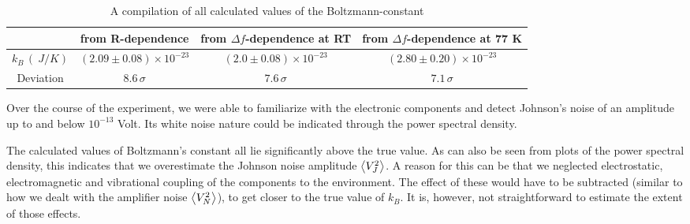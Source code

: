 \begin{table}[H]
	\renewcommand{\arraystretch}{1.5}
	\centering
	\Large
	\begin{adjustbox}{width=1\textwidth}
		\begin{tabular}{c|ccc}
			& from R-dependence & from $\Delta f$-dependence at RT & from $\Delta f$-dependence at 77 K 
			\\
			\hline
			$k_B \, (\SI{}{J/K})$ & $(2.09 \pm 0.08) \times 10^{-23}$ & $(2.0 \pm 0.08) \times 10^{-23}$  & $(2.80 \pm 0.20) \times 10^{-23}$
			\\
			Deviation & $8.6 \, \sigma$ & $7.6 \, \sigma$ & $7.1 \, \sigma$
			\\
		\end{tabular}
	\end{adjustbox}
	\caption{A compilation of all calculated values of the Boltzmann-constant }
	\label{tab:kB}
\end{table}

Over the course of the experiment, we were able to familiarize with the electronic components and detect Johnson's noise of an amplitude up to and below $10^{-13}$ Volt. Its white noise nature could be indicated through the power spectral density.

The calculated values of Boltzmann's constant all lie significantly above the true value. As can also be seen from plots of the power spectral density, this indicates that we overestimate the Johnson noise amplitude $\expval{V_J^2}$. A reason for this can be that we neglected electrostatic, electromagnetic and vibrational coupling of the components to the environment. The effect of these would have to be subtracted (similar to how we dealt with the amplifier noise $\expval{V_N^2}$), to get closer to the true value of $k_B$. It is, however, not straightforward to estimate the extent of those effects.



